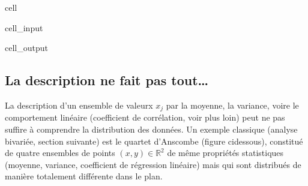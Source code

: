 \documentclass[letterpaper,10pt,french]{sphinxmanual}
\begin{document}
\begin{sphinxuseclass}{cell}
\begin{sphinxuseclass}{cell_input}
\begin{sphinxVerbatim}[commandchars=\\\{\}]
    

   
 
\end{sphinxVerbatim}

\end{sphinxuseclass}
\begin{sphinxuseclass}{cell_output}
\noindent{}

\end{sphinxuseclass}
\end{sphinxuseclass}

\subsection{La description ne fait pas tout…}
\label{\detokenize{statsdescriptives:la-description-ne-fait-pas-tout}}
\sphinxAtStartPar
La description d’un ensemble de valeurx \(x_j\) par la moyenne, la variance, voire le comportement linéaire (coefficient de corrélation, voir plus loin) peut ne pas suffire à comprendre la distribution des données. Un exemple classique (analyse bivariée, section suivante) est le quartet d’Anscombe (figure ci\sphinxhyphen{}dessous), constitué de quatre ensembles de points  \((x,y)\in\mathbb{R}^2\) de même propriétés statistiques (moyenne, variance, coefficient de régression linéaire) mais qui sont distribués de manière totalement différente dans le plan.
\end{document}
